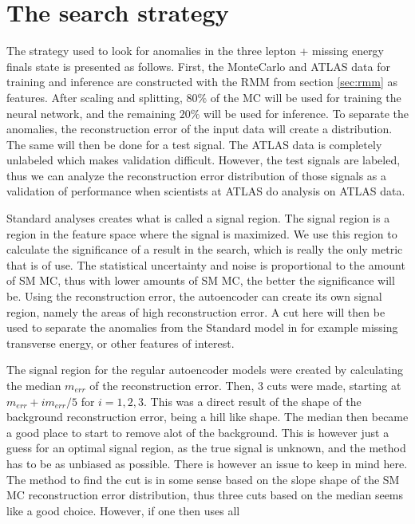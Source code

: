 \section{The search strategy}\label{sec:strategy}
The strategy used to look for anomalies in the three lepton + missing energy finals state is presented as follows. 
First, the MonteCarlo and ATLAS data for training and inference are constructed with the RMM from section 
\ref{sec:rmm} as features. After scaling and splitting, $80\%$ of the MC will be used for training the neural 
network, and the remaining $20\%$ will be used for inference. To separate the anomalies, the reconstruction 
error of the input data will create a distribution. The same will then be done for a test signal. The ATLAS data 
is completely unlabeled which makes validation difficult. However, the test signals are labeled, thus we can 
analyze the reconstruction error distribution of those signals as a validation of performance when scientists at 
ATLAS do analysis on ATLAS data. \par
Standard analyses creates what is called a signal region. The signal region is a region in the feature space where 
the signal is maximized. We use this region to calculate the significance of a result in the search, which is 
really the only metric that is of use. The statistical uncertainty and noise is proportional to the amount of SM MC, 
thus with lower amounts of SM MC, the better the significance will be. Using the reconstruction error, the autoencoder 
can create its own signal region, namely the areas of high reconstruction error. A cut here will then be used to 
separate the anomalies from the Standard model in for example missing transverse energy, or other features of interest. \par 
The signal region for the regular autoencoder models were created by calculating the median $m_{err}$ of the 
reconstruction error. Then, 3 cuts were made, starting at $m_{err} + im_{err}/5$ for $i = 1,2,3$. This was a direct 
result of the shape of the background reconstruction error, being a hill like shape. The median then became a 
good place to start to remove alot of the background. This is however just a guess for an optimal signal region, 
as the true signal is unknown, and the method has to be as unbiased as possible. There is however an issue to keep 
in mind here. The method to find the cut is in some sense based on the slope shape of the SM MC reconstruction 
error distribution, thus three cuts based on the median seems like a good choice. However, if one then uses all 
